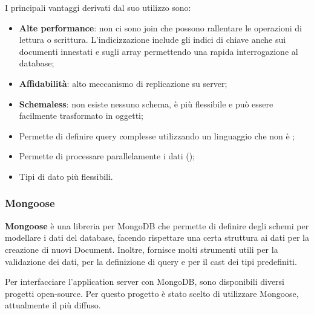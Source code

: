 I principali vantaggi derivati dal suo utilizzo sono:
\begin{itemize}
	\item \textbf{Alte performance}: non ci sono join che possono rallentare le operazioni di lettura o scrittura. L’indicizzazione include gli indici di chiave anche sui documenti innestati e sugli array permettendo una rapida interrogazione al database;
	\item \textbf{Affidabilità}: alto meccanismo di replicazione su server;
	\item \textbf{Schemaless}: non esiste nessuno schema, è più flessibile e può essere facilmente trasformato in oggetti;	
	\item Permette di definire query complesse utilizzando un linguaggio che non è ;
	\item Permette di processare parallelamente i dati ();
	\item Tipi di dato più flessibili.
\end{itemize}

\subsubsection{Mongoose}
\textbf{Mongoose} è una libreria per MongoDB che permette di definire degli schemi per modellare i dati del database, facendo rispettare una certa struttura ai dati per la creazione di nuovi Document. Inoltre, fornisce molti strumenti utili per la validazione dei dati, per la definizione di query e per il cast dei tipi predefiniti.

Per interfacciare l'application server con MongoDB, sono disponibili diversi progetti open-source. Per questo progetto è stato scelto di utilizzare Mongoose, attualmente il più diffuso.	

